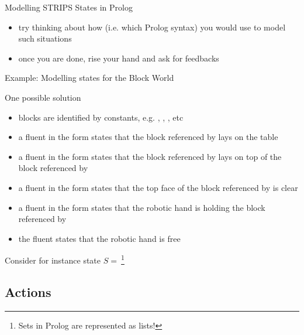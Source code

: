 \documentclass[presentation]{beamer}\mode<presentation>{\usetheme{AMSBolognaFC}}
\begin{document}
\begin{frame}[allowframebreaks]{Modelling STRIPS States in Prolog}
\begin{itemize}
    \item try thinking about \alert{how} (i.e. which Prolog syntax) you would use to model such situations

    \item once you are done, rise your hand and ask for feedbacks
\end{itemize}
\end{frame}

\begin{frame}[allowframebreaks]{Example: Modelling states for the Block World}

One possible solution
%
\begin{itemize}
    \item blocks are identified by constants, e.g. , , , etc
    \vfill
    \item a fluent in the form  states that the block referenced by  lays on the table
    \vfill
    \item a fluent in the form  states that the block referenced by  lays on top of the block referenced by 
    \vfill
    \item a fluent in the form  states that the top face of the block referenced by  is clear
    \vfill
    \item a fluent in the form  states that the robotic hand is holding the block referenced by 
    \vfill
    \item the fluent  states that the robotic hand is free
\end{itemize}

\framebreak

Consider for instance state $S =\ $\footnote{Sets in Prolog are represented as lists!}
%
\begin{center}

\end{center}

\end{frame}

\subsection{Actions}
\end{document}
